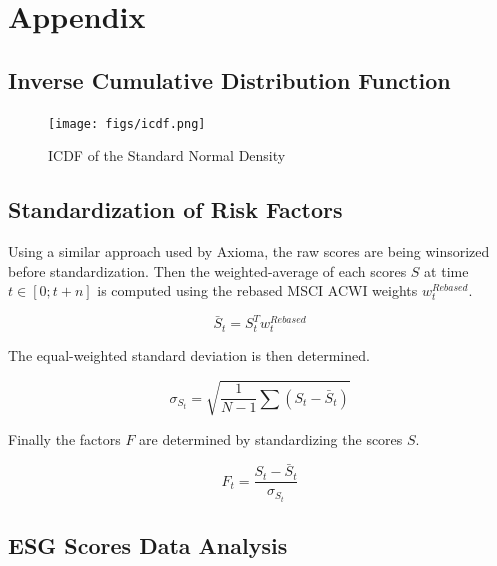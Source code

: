 \documentclass[11pt,a4paper]{article}
\begin{document}
\clearpage




\clearpage

\appendix

\section{Appendix}

\subsection{Inverse Cumulative Distribution Function}\label{sec:icdf}

\begin{figure}[h!]
    \centering
    \begin{minipage}{0.8\textwidth}
        \centering
        \texttt{[image: figs/icdf.png]}
    \end{minipage}\hfill
    \caption{ICDF of the Standard Normal Density}
    \label{fig:icdf}
\end{figure}

\subsection{Standardization of Risk Factors}\label{sec:stand_rf}

Using a similar approach used by Axioma, the raw scores are being winsorized before standardization. Then the weighted-average of each scores $S$ at time $t\in[0;t+n]$ is computed using the rebased MSCI ACWI weights $w_{t}^{Rebased}$.
    
\begin{equation}
    \bar{S}_t = S_t^{T}w_{t}^{Rebased}
\end{equation}

The equal-weighted standard deviation is then determined.

\begin{equation}
    \sigma_{S_t} = \sqrt{\frac{1}{N-1}\sum(S_t - \bar{S}_t)}
\end{equation}

Finally the factors $F$ are determined by standardizing the scores $S$.

\begin{equation}
    F_{t}= \frac{S_t - \bar{S}_t}{\sigma_{S_t}}
\end{equation} 

\clearpage

\subsection{ESG Scores Data Analysis}\label{appendix:esg_analysis}
\end{document}
